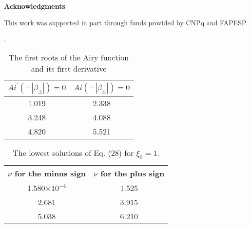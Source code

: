 \documentclass[a4paper,12pt,titlepage]{article}
\begin{document}
\smallskip

\bigskip

\bigskip

\noindent \textbf{Acknowledgments}

This work was supported in part through funds provided by CNPq and FAPESP.

\newpage
\begin{table}[tbp]
\caption{The first roots of the Airy function and its first derivative}
\label{t1}
.
\par
\begin{center}
\begin{tabular}{|c|c|}
\hline\hline
$Ai^{\prime }(-|\beta _{\pm }|)=0$ & $Ai(-|\beta _{\pm }|)=0$ \\ \hline
1.019 & 2.338 \\
3.248 & 4.088 \\
4.820 & 5.521 \\ \hline\hline
\end{tabular}
\end{center}
\end{table}

\begin{table}[tbp]
\caption{The lowest solutions of Eq. (28) for $\xi_{0}=1$.}
\label{t2}
\begin{center}
\begin{tabular}{|c|c|}
\hline\hline
$\nu$ \textrm{for the minus sign} & $\nu$ \textrm{for the plus sign} \\
\hline
1.580$\times 10^{-4}$ & 1.525 \\
2.681 & 3.915 \\
5.038 & 6.210 \\ \hline\hline
\end{tabular}
\end{center}
\end{table}

\newpage
\end{document}
